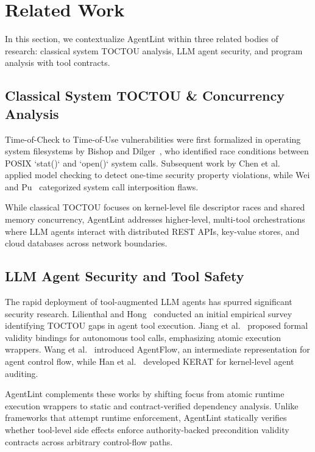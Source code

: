 \section{Related Work}
\label{sec:related_work}

In this section, we contextualize AgentLint within three related bodies of research: classical system TOCTOU analysis, LLM agent security, and program analysis with tool contracts.

\subsection{Classical System TOCTOU & Concurrency Analysis}
Time-of-Check to Time-of-Use vulnerabilities were first formalized in operating system filesystems by Bishop and Dilger~\cite{bishop1996checking}, who identified race conditions between POSIX `stat()` and `open()` system calls. Subsequent work by Chen et al.~\cite{chen2002model} applied model checking to detect one-time security property violations, while Wei and Pu~\cite{wei2005toctou} categorized system call interposition flaws. 

While classical TOCTOU focuses on kernel-level file descriptor races and shared memory concurrency, AgentLint addresses higher-level, multi-tool orchestrations where LLM agents interact with distributed REST APIs, key-value stores, and cloud databases across network boundaries.

\subsection{LLM Agent Security and Tool Safety}
The rapid deployment of tool-augmented LLM agents has spurred significant security research. Lilienthal and Hong~\cite{lilienthal2025mind} conducted an initial empirical survey identifying TOCTOU gaps in agent tool execution. Jiang et al.~\cite{jiang2026atomicity} proposed formal validity bindings for autonomous tool calls, emphasizing atomic execution wrappers. Wang et al.~\cite{wang2026agentflow} introduced AgentFlow, an intermediate representation for agent control flow, while Han et al.~\cite{han2026kerat} developed KERAT for kernel-level agent auditing.

AgentLint complements these works by shifting focus from atomic runtime execution wrappers to static and contract-verified dependency analysis. Unlike frameworks that attempt runtime enforcement, AgentLint statically verifies whether tool-level side effects enforce authority-backed precondition validity contracts across arbitrary control-flow paths.

